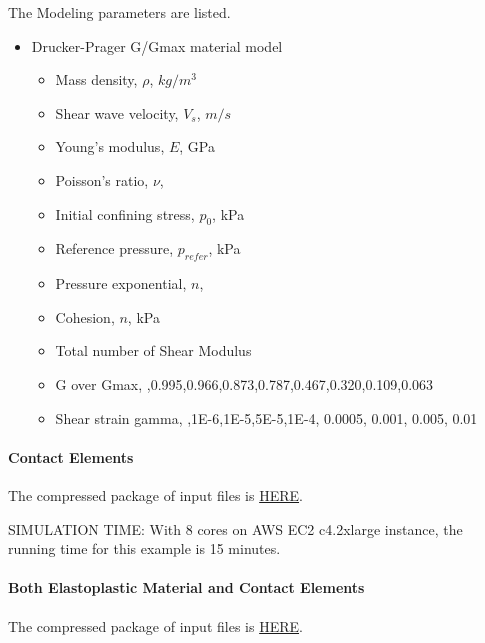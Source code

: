 The Modeling parameters are listed.
\begin{itemize}
  \item Drucker-Prager G/Gmax material model 
  \begin{itemize}
    \item Mass density, $\rho$, \enspace {} $kg/m^3$
    \item Shear wave velocity, $V_s$, \enspace {} $m/s$
    \item Young's modulus, $E$, \enspace {} GPa
    \item Poisson's ratio, $\nu$, \enspace {}
    \item Initial confining stress, $p_0$, \enspace {} kPa
    \item Reference pressure, $p_{refer} $, \enspace {} kPa
    \item Pressure exponential, $ n  $, \enspace {}
    \item Cohesion, $ n  $, \enspace {} kPa
    \item Total number of Shear Modulus \enspace {}
    \item G over Gmax, \enspace {},0.995,0.966,0.873,0.787,0.467,0.320,0.109,0.063
    \item Shear strain gamma, \enspace {},1E-6,1E-5,5E-5,1E-4, 0.0005, 0.001, 0.005, 0.01
  \end{itemize}
\end{itemize}


\paragraph{Contact Elements}
The compressed package of input files is  
\href{https://github.com/yuan-energy/Real-ESSI-Short-Course-Examples/tree/master/short-course-examples/nonlinear_analysis_steps/soil-structure/contact/contact.tgz?raw=true}{HERE}. 

SIMULATION TIME: With 8 cores on AWS EC2 c4.2xlarge instance, the running time for this example is 15 minutes.

\paragraph{Both Elastoplastic Material and Contact Elements}
The compressed package of input files is  
\href{https://github.com/yuan-energy/Real-ESSI-Short-Course-Examples/tree/master/short-course-examples/nonlinear_analysis_steps/soil-structure/both_plastic_contact/both_plastic_contact.tgz?raw=true}{HERE}. 






